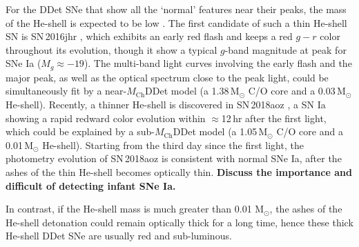 \documentclass[twocolumn]{aastex631}
\newcommand{\Mch}{$M_\mathrm{Ch}$}
\begin{document}
For the DDet SNe that show all the `normal' features near their peaks, the mass of the He-shell is expected to be low \citep[$\lesssim0.01\,\mathrm{M_\odot}$;][]{Kromer_DD_2010,Sim_2010,Shen_DD_2018,polin_observational_2019}. The first candidate of such a thin He-shell SN is SN\,2016jhr \citep{jiang_16jhr_2017}, which exhibits an early red flash and keeps a red $g-r$ color throughout its evolution, though it show a typical $g$-band magnitude at peak for SNe Ia ($M_g\approx-19$). The multi-band light curves involving the early flash and the major peak, as well as the optical spectrum close to the peak light, could be simultaneously fit by a near-\Mch DDet model (a 1.38\,$\mathrm{M_\odot}$ C/O core and a 0.03\,$\mathrm{M_\odot}$ He-shell). Recently, a thinner He-shell is discovered in SN\,2018aoz \citep{Ni_2022}, a SN Ia showing a rapid redward color evolution within $\approx$12\,hr after the first light, which could be explained by a sub-\Mch DDet model (a 1.05\,$\mathrm{M_\odot}$ C/O core and a 0.01\,$\mathrm{M_\odot}$ He-shell). Starting from the third day since the first light, the photometry evolution of SN\,2018aoz is consistent with normal SNe Ia, after the ashes of the thin He-shell becomes optically thin. \textbf{Discuss the importance and difficult of detecting infant SNe Ia.}

In contrast, if the He-shell mass is much greater than 0.01\,$\,\mathrm{M_\odot}$, the ashes of the He-shell detonation could remain optically thick for a long time, hence these thick He-shell DDet SNe are usually red and sub-luminous.
\end{document}
